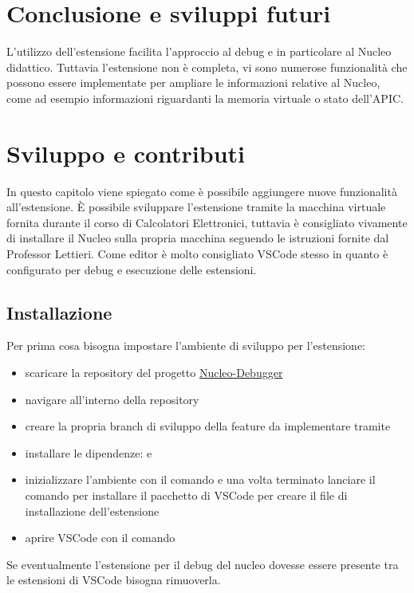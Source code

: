 \chapter{Conclusione e sviluppi futuri}
L'utilizzo dell'estensione facilita l'approccio al debug e in particolare al Nucleo didattico. Tuttavia l'estensione non è completa, vi sono numerose funzionalità che possono essere implementate per ampliare le informazioni relative al Nucleo, come ad esempio informazioni riguardanti la memoria virtuale o stato dell'APIC.

\chapter{Sviluppo e contributi}
In questo capitolo viene spiegato come è possibile aggiungere nuove funzionalità all'estensione. È possibile sviluppare l'estensione tramite la macchina virtuale fornita durante il corso di Calcolatori Elettronici, tuttavia è consigliato vivamente di installare il Nucleo sulla propria macchina seguendo le istruzioni fornite dal Professor Lettieri\cite{mainsite}. Come editor è molto consigliato VSCode stesso in quanto è configurato per debug e esecuzione delle estensioni.

\section*{Installazione}
Per prima cosa bisogna impostare l'ambiente di sviluppo per l'estensione:
\begin{itemize}
    \item scaricare la repository del progetto \href{google.com}{Nucleo-Debugger} 
    \item navigare all'interno della repository
    \item creare la propria branch di sviluppo della feature da implementare tramite 
    \item installare le dipendenze:  e 
    \item inizializzare l'ambiente con il comando  e una volta terminato lanciare il comando  per installare il pacchetto di VSCode per creare il file di installazione dell'estensione
    \item aprire VSCode con il comando 
\end{itemize}

Se eventualmente l'estensione per il debug del nucleo dovesse essere presente tra le estensioni di VSCode bisogna rimuoverla.

